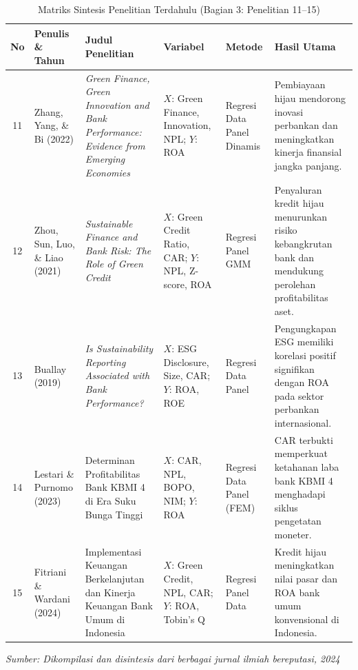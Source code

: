 \documentclass[12pt,a4paper]{article}
\numberwithin{equation}{section}
\begin{document}
\begin{table}[H]
  \caption{Matriks Sintesis Penelitian Terdahulu (Bagian 3: Penelitian 11--15)}
  \label{tab:penelitian_terdahulu_c}
  \footnotesize
  \begin{tabularx}{\textwidth}{|c|>{\raggedright\arraybackslash}p{2.3cm}|>{\raggedright\arraybackslash}X|>{\raggedright\arraybackslash}p{1.9cm}|>{\raggedright\arraybackslash}p{1.8cm}|>{\raggedright\arraybackslash}X|}
    \hline
    \textbf{No} & \textbf{Penulis \& Tahun} & \textbf{Judul Penelitian} & \textbf{Variabel} & \textbf{Metode} & \textbf{Hasil Utama} \\
    \hline
    11 & Zhang, Yang, \& Bi (2022) & \emph{Green Finance, Green Innovation and Bank Performance: Evidence from Emerging Economies} & $X$: Green Finance, Innovation, NPL; $Y$: ROA & Regresi Data Panel Dinamis & Pembiayaan hijau mendorong inovasi perbankan dan meningkatkan kinerja finansial jangka panjang. \\
    \hline
    12 & Zhou, Sun, Luo, \& Liao (2021) & \emph{Sustainable Finance and Bank Risk: The Role of Green Credit} & $X$: Green Credit Ratio, CAR; $Y$: NPL, Z-score, ROA & Regresi Panel GMM & Penyaluran kredit hijau menurunkan risiko kebangkrutan bank dan mendukung perolehan profitabilitas aset. \\
    \hline
    13 & Buallay (2019) & \emph{Is Sustainability Reporting Associated with Bank Performance?} & $X$: ESG Disclosure, Size, CAR; $Y$: ROA, ROE & Regresi Data Panel & Pengungkapan ESG memiliki korelasi positif signifikan dengan ROA pada sektor perbankan internasional. \\
    \hline
    14 & Lestari \& Purnomo (2023) & Determinan Profitabilitas Bank KBMI 4 di Era Suku Bunga Tinggi & $X$: CAR, NPL, BOPO, NIM; $Y$: ROA & Regresi Data Panel (FEM) & CAR terbukti memperkuat ketahanan laba bank KBMI 4 menghadapi siklus pengetatan moneter. \\
    \hline
    15 & Fitriani \& Wardani (2024) & Implementasi Keuangan Berkelanjutan dan Kinerja Keuangan Bank Umum di Indonesia & $X$: Green Credit, NPL, CAR; $Y$: ROA, Tobin's Q & Regresi Panel Data & Kredit hijau meningkatkan nilai pasar dan ROA bank umum konvensional di Indonesia. \\
    \hline
  \end{tabularx}
  \begin{flushleft}
    \textit{Sumber: Dikompilasi dan disintesis dari berbagai jurnal ilmiah bereputasi, 2024}
  \end{flushleft}
\end{table}
\end{document}
